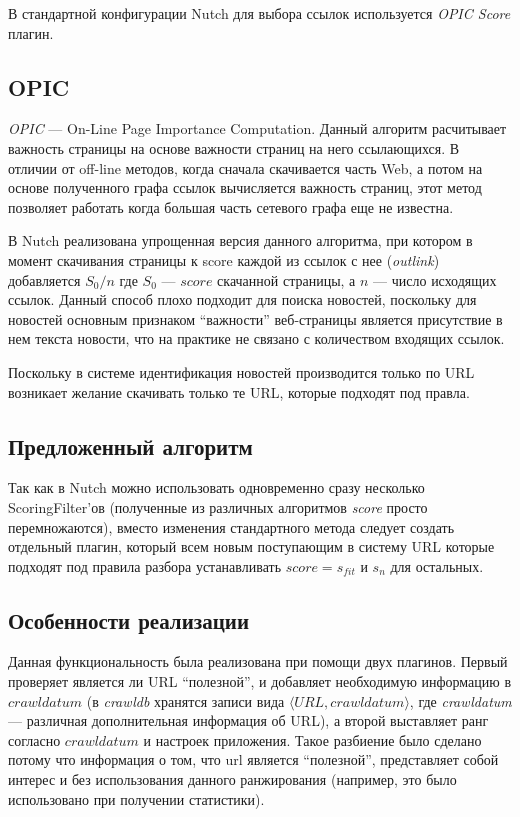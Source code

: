 В стандартной конфигурации Nutch для выбора ссылок используется \textit{OPIC Score} плагин.
\subsection{OPIC}
\textit{OPIC} --- On-Line Page Importance Computation\cite{opic}. Данный алгоритм расчитывает важность страницы на основе важности страниц на него ссылающихся. В отличии от off-line методов, когда сначала скачивается часть Web, а потом на основе полученного графа ссылок вычисляется важность страниц, этот метод позволяет работать когда большая часть сетевого графа еще не известна.

В Nutch реализована упрощенная версия данного алгоритма, при котором в момент скачивания страницы к score каждой из ссылок с нее (\textit{outlink}) добавляется $S_{0}/n$ где $S_{0}$ --- $score$ скачанной страницы, а $n$ --- число исходящих ссылок. Данный способ плохо подходит для поиска новостей, поскольку для новостей основным признаком ``важности'' веб-страницы является присутствие в нем текста новости, что на практике не связано с количеством входящих ссылок.

Поскольку в системе идентификация новостей производится только по URL возникает желание скачивать только те URL, которые подходят под правла.

\subsection{Предложенный алгоритм}
Так как в Nutch можно использовать одновременно сразу несколько ScoringFilter'ов (полученные из различных алгоритмов \textit{score} просто перемножаются), вместо изменения стандартного метода следует создать отдельный плагин, который всем новым поступающим в систему URL которые подходят под правила разбора устанавливать $score=s_{fit}$ и $s_{n}$ для остальных.
\subsection{Особенности реализации}
Данная функциональность была реализована при помощи двух плагинов. Первый проверяет является ли URL ``полезной'', и добавляет необходимую информацию в $crawldatum$ (в \textit{crawldb} хранятся записи вида $\langle URL, crawldatum\rangle$, где \textit{crawldatum} --- различная дополнительная информация об URL), а второй выставляет ранг согласно $crawldatum$ и настроек приложения. Такое разбиение было сделано потому что информация о том, что url является ``полезной'', представляет собой интерес и без использования данного ранжирования (например, это было использовано при получении статистики).
